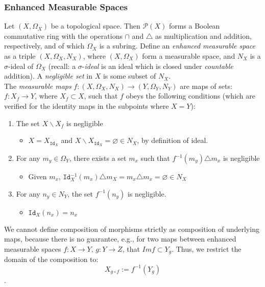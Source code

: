 \documentclass{article}
\begin{document}
\subsubsection{Enhanced Measurable Spaces}
Let $(X,\Omega_X)$ be a topological space.  Then $\mathcal{P}(X)$ forms a Boolean commutative ring with the operations $\cap$ and $\triangle$ as multiplication and addition, respectively, and of which $\Omega_X$ is a subring.
Define an \textit{enhanced measurable space} as a triple $(X,\Omega_X,N_X)$, where $(X,\Omega_X)$ form a measurable space, and $N_X$ is a $\sigma$-ideal of $\Omega_{X}$ (recall: a $\sigma$-\textit{ideal} is an ideal which is closed under \textit{countable} addition).  A \textit{negligible set} in $X$ is some subset of $N_{X}$.\\The \textit{measurable maps} $f: (X,\Omega_X, N_X)\rightarrow(Y,\Omega_Y,N_Y)$ are maps of sets: $f: X_f\rightarrow{}Y$, where $X_f\subset{}X$, such that $f$ obeys the following conditions (which are verified for the identity maps in the subpoints where $X=Y$):
\begin{enumerate}
\item The set $X\backslash{}X_f$ is negligible
\begin{itemize}\item $X=X_{\texttt{Id}_X}$ and $X\backslash{}X_{\texttt{Id}_X}=\varnothing\in{}N_X$, by definition of ideal. \end{itemize}
\item For any $m_{y}\in\Omega_Y$, there exists a set $m_{x}$ such that $f^{-1}(m_y)\triangle{}m_x$ is negligible
\begin{itemize}\item Given $m_{x}$, $\texttt{Id}^{-1}_X(m_x)\triangle{}m_X = m_x\triangle{}m_x = \varnothing\in{}N_X$ \end{itemize}
\item For any $n_y\in N_Y$, the set $f^{-1}(n_y)$ is negligible.
\begin{itemize} \item $\texttt{Id}_X(n_x) = n_x$ \end{itemize}
\end{enumerate}
We cannot define composition of morphisms strictly as composition of underlying maps, because there is no guarantee, e.g., for two maps between enhanced measurable spaces $f:X\rightarrow{}Y,\,g:Y\rightarrow{}Z$, that $\textit{Im}f\subset{}Y_g$.  Thus, we restrict the domain of the composition to:
\begin{equation*}
     X_{g\circ{}f} := f^{-1}(Y_g)
\end{equation*}.
\end{document}
